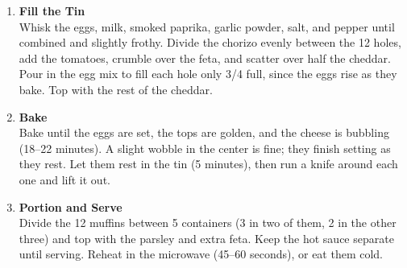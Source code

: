 \begin{enumerate}
      \item \textbf{Fill the Tin} \\
            Whisk the eggs, milk, smoked paprika, garlic powder, salt, and pepper until combined
            and slightly frothy. Divide the chorizo evenly between the 12 holes, add the
            tomatoes, crumble over the feta, and scatter over half the cheddar. Pour in the egg
            mix to fill each hole only 3/4 full, since the eggs rise as they bake. Top with the
            rest of the cheddar.

      \item \textbf{Bake} \\
            Bake until the eggs are set, the tops are golden, and the cheese is bubbling
            (18--22 minutes). A slight wobble in the center is fine; they finish setting as they
            rest. Let them rest in the tin (5 minutes), then run a knife around each one and lift
            it out.

      \item \textbf{Portion and Serve} \\
            Divide the 12 muffins between 5 containers (3 in two of them, 2 in the other three)
            and top with the parsley and extra feta. Keep the hot sauce separate until serving.
            Reheat in the microwave (45--60 seconds), or eat them cold.

\end{enumerate}



